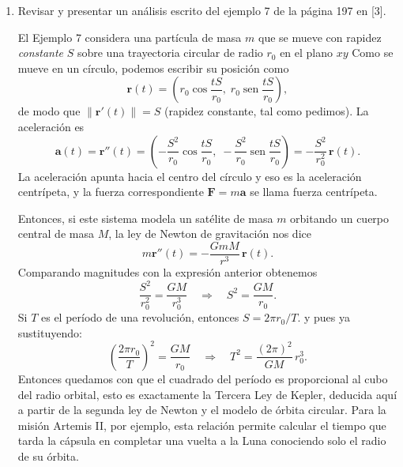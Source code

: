 










\begin{enumerate}

    \item Revisar y presentar un análisis escrito del ejemplo 7 de la página 197 en [3].

    \begin{respuesta}[title=P15.6]

    El Ejemplo 7 considera una partícula de masa $m$ que se mueve con rapidez
\emph{constante} $S$ sobre una trayectoria circular de radio $r_0$ en el plano
$xy$ Como se mueve en un círculo, podemos escribir su posición como
\[
  \mathbf{r}(t)
  = \left(r_0\cos\frac{tS}{r_0},\; r_0\operatorname{sen}\frac{tS}{r_0}\right),
\]
de modo que $\|\mathbf{r}'(t)\| = S$ (rapidez constante, tal como pedimos).
La aceleración es
\[
  \mathbf{a}(t) = \mathbf{r}''(t)
  = \left(-\frac{S^2}{r_0}\cos\frac{tS}{r_0},\;
           -\frac{S^2}{r_0}\operatorname{sen}\frac{tS}{r_0}\right)
  = -\frac{S^2}{r_0^2}\,\mathbf{r}(t).
\]
La aceleración apunta hacia el centro del círculo y eso es la
aceleración centrípeta, y la fuerza correspondiente $\mathbf{F}=m\mathbf{a}$
se llama fuerza centrípeta.

Entonces, si este sistema modela un satélite de masa $m$ orbitando un cuerpo
central de masa $M$, la ley de Newton de gravitación nos dice
\[
  m\mathbf{r}''(t) = -\frac{GmM}{r^3}\,\mathbf{r}(t).
\]
Comparando magnitudes con la expresión anterior obtenemos
\[
  \frac{S^2}{r_0^2} = \frac{GM}{r_0^3}
  \quad\Longrightarrow\quad
  S^2 = \frac{GM}{r_0}.
\]
Si $T$ es el período de una revolución, entonces $S = 2\pi r_0 / T$.
y pues ya sustituyendo:
\[
  \left(\frac{2\pi r_0}{T}\right)^2 = \frac{GM}{r_0}
  \quad\Longrightarrow\quad
  \boxed{T^2 = \frac{(2\pi)^2}{GM}\,r_0^3.}
\]
Entonces quedamos con que el cuadrado del período es proporcional al cubo del
radio orbital, esto es exactamente la Tercera Ley de Kepler,
deducida aquí a partir de la segunda ley de Newton y el modelo de órbita
circular.  Para la misión Artemis II, por ejemplo, esta relación permite
calcular el tiempo que tarda la cápsula en completar una vuelta a la Luna
conociendo solo el radio de su órbita.
        \vspace{5cm}
    \end{respuesta}


\end{enumerate}
